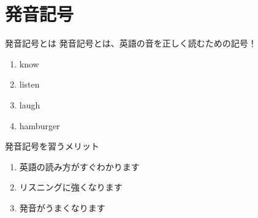 \documentclass[aspectratio=169,xcolor={dvipsnames,table}]{beamer}
\begin{document}
\section{発音記号}
\begin{frame}[plain]{発音記号とは}
 発音記号とは、英語の音を正しく読むための記号！

\begin{enumerate}
 \item<2-> know\hspace{46pt}
 \item<4-> listen\hspace{42pt} 
 \item<6-> laugh\hspace{42pt} 
 \item<8-> hamburger\hspace{15pt} 

\end{enumerate}
\end{frame}
\begin{frame}[plain]{発音記号を習うメリット}
 \begin{enumerate}
  \item<2-> 英語の読み方がすぐわかります
  \item<3-> リスニングに強くなります
  \item<4-> 発音がうまくなります
 \end{enumerate}

\bigskip

\end{frame}
\end{document}
